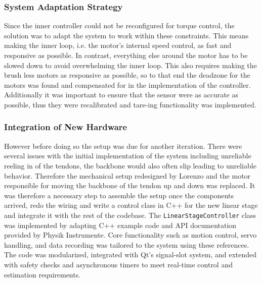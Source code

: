 \subsubsection{System Adaptation Strategy}
Since the inner controller could not be reconfigured for torque control, the solution was to adapt the system to work within these constraints. This means making the inner loop, i.e. the motor's internal speed control, as fast and responsive as possible. In contrast, everything else around the motor has to be slowed down to avoid overwhelming the inner loop.
\newline \newline
This also requires making the brush less motors as responsive as possible, so to that end the deadzone for the motors was found and compensated for in the implementation of the controller. Additionally it was important to ensure that the sensor were as accurate as possible, thus they were recalibrated and tare-ing functionality was implemented.

\subsubsection{Integration of New Hardware}
However before doing so the setup was due for another iteration. There were several issues with the initial implementation of the system including unreliable reeling in of the tendons, the backbone would also often slip leading to unreliable behavior. Therefore the mechanical setup redesigned by Lorenzo and the motor responsible for moving the backbone of the tendon up and down was replaced. It was therefore a necessary step to assemble the setup once the components arrived, redo the wiring and write a control class in C++ for the new linear stage and integrate it with the rest of the codebase.
\newline \newline
The \texttt{LinearStageController} class was implemented by adapting C++ example code and API documentation provided by Physik Instrumente. Core functionality such as motion control, servo handling, and data recording was tailored to the system using these references. The code was modularized, integrated with Qt’s signal-slot system, and extended with safety checks and asynchronous timers to meet real-time control and estimation requirements.

